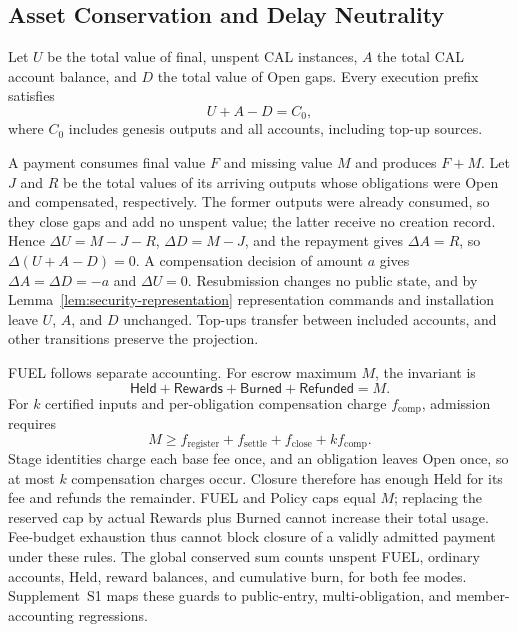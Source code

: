 \subsection{Asset Conservation and Delay Neutrality}
\label{sec:security-conservation}

\begin{theorem}
\label{thm:security-conservation}
Let $U$ be the total value of final, unspent CAL instances, $A$ the total
CAL account balance, and $D$ the total value of Open gaps. Every
execution prefix satisfies
\begin{equation}
 U+A-D=C_0,
 \label{eq:security-conservation}
\end{equation}
where $C_0$ includes genesis outputs and all accounts, including top-up
sources.
\end{theorem}
\begin{IEEEproof}
A payment consumes final value $F$ and missing value $M$ and produces $F+M$. Let $J$ and $R$ be the total values of its arriving outputs whose obligations were Open and compensated, respectively. The former outputs were already consumed, so they close gaps and add no unspent value; the latter receive no creation record. Hence $\Delta U=M-J-R$, $\Delta D=M-J$, and the repayment gives $\Delta A=R$, so $\Delta(U+A-D)=0$. A compensation decision of amount $a$ gives $\Delta A=\Delta D=-a$ and $\Delta U=0$. Resubmission changes no public state, and by Lemma~\ref{lem:security-representation} representation commands and installation leave $U$, $A$, and $D$ unchanged. Top-ups transfer between included accounts, and other transitions preserve the projection.
\end{IEEEproof}

FUEL follows separate accounting. For escrow maximum $M$, the invariant is
\[
 \mathsf{Held}+\mathsf{Rewards}+\mathsf{Burned}+\mathsf{Refunded}=M.
\]
For $k$ certified inputs and per-obligation compensation charge $f_{\mathrm{comp}}$, admission requires
\[
 M\ge f_{\mathrm{register}}+f_{\mathrm{settle}}+f_{\mathrm{close}}
       +k f_{\mathrm{comp}}.
\]
Stage identities charge each base fee once, and an obligation leaves Open
once, so at most $k$ compensation charges occur. Closure therefore has enough Held
for its fee and refunds the remainder. FUEL and Policy caps equal $M$;
replacing the reserved cap by actual Rewards plus Burned cannot increase
their total usage. Fee-budget exhaustion thus cannot block closure of a
validly admitted payment under these rules. The global conserved sum counts
unspent FUEL, ordinary accounts, Held, reward balances, and cumulative burn,
for both fee modes. Supplement~S1 maps these guards to public-entry,
multi-obligation, and member-accounting regressions.


